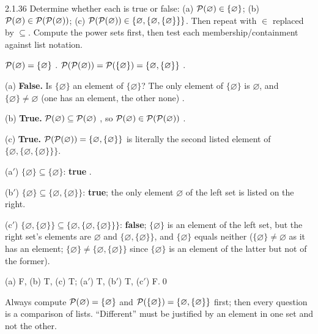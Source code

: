 \begin{bookex}[recommended]{2.1.36}
Determine whether each is true or false: (a) $\mathcal{P}(\varnothing)\in\{\varnothing\}$; (b) $\mathcal{P}(\varnothing)\in\mathcal{P}(\mathcal{P}(\varnothing))$; (c) $\mathcal{P}(\mathcal{P}(\varnothing))\in\{\varnothing,\{\varnothing,\{\varnothing\}\}\}$. Then repeat with $\in$ replaced by $\subseteq$.
\solution
\plan Compute the power sets first, then test each membership/containment against list notation.
\begin{steps}
\item $\mathcal{P}(\varnothing)=\{\varnothing\}$ . $\mathcal{P}(\mathcal{P}(\varnothing))=\mathcal{P}(\{\varnothing\})=\{\varnothing,\{\varnothing\}\}$ .
\item (a) \textbf{False.} Is $\{\varnothing\}$ an element of $\{\varnothing\}$? The only element of $\{\varnothing\}$ is $\varnothing$, and $\{\varnothing\}\ne\varnothing$ (one has an element, the other none) .
\item (b) \textbf{True.} $\mathcal{P}(\varnothing)\subseteq\mathcal{P}(\varnothing)$ , so $\mathcal{P}(\varnothing)\in\mathcal{P}(\mathcal{P}(\varnothing))$ .
\item (c) \textbf{True.} $\mathcal{P}(\mathcal{P}(\varnothing))=\{\varnothing,\{\varnothing\}\}$ is literally the second listed element of $\{\varnothing,\{\varnothing,\{\varnothing\}\}\}$.
\item (a$'$) $\{\varnothing\}\subseteq\{\varnothing\}$: \textbf{true} .
\item (b$'$) $\{\varnothing\}\subseteq\{\varnothing,\{\varnothing\}\}$: \textbf{true}; the only element $\varnothing$ of the left set is listed on the right.
\item (c$'$) $\{\varnothing,\{\varnothing\}\}\subseteq\{\varnothing,\{\varnothing,\{\varnothing\}\}\}$: \textbf{false}; $\{\varnothing\}$ is an element of the left set, but the right set's elements are $\varnothing$ and $\{\varnothing,\{\varnothing\}\}$, and $\{\varnothing\}$ equals neither ($\{\varnothing\}\ne\varnothing$ as it has an element; $\{\varnothing\}\ne\{\varnothing,\{\varnothing\}\}$ since $\{\varnothing\}$ is an element of the latter but not of the former).
\end{steps}
\conclusion (a) F, (b) T, (c) T; (a$'$) T, (b$'$) T, (c$'$) F.\qed
\begin{compare}
\item Always compute $\mathcal{P}(\varnothing)=\{\varnothing\}$ and $\mathcal{P}(\{\varnothing\})=\{\varnothing,\{\varnothing\}\}$ first; then every question is a comparison of lists. ``Different'' must be justified by an element in one set and not the other.
\end{compare}
\end{bookex}

